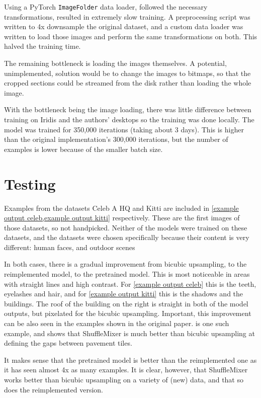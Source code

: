 \documentclass{article}
\begin{document}
    Using a PyTorch {\tt ImageFolder} data loader, followed the necessary transformations, resulted in extremely slow training. A preprocessing script was written to 4x downsample the original dataset, and a custom data loader was written to load those images and perform the same transformations on both. This halved the training time.

    The remaining bottleneck is loading the images themselves. A potential, unimplemented, solution would be to change the images to bitmaps, so that the cropped sections could be streamed from the disk rather than loading the whole image. 

    With the bottleneck being the image loading, there was little difference between training on Iridis and the authors' desktops so the training was done locally. The model was trained for 350,000 iterations (taking about 3 days). This is higher than the original implementation's 300,000 iterations, but the number of examples is lower because of the smaller batch size. 

    \section{Testing}

    Examples from the datasets Celeb A HQ \citep{liu2015faceattributes} and Kitti \citep{Geiger2012CVPR} are included in \cref{example output celeb,example output kitti} respectively. These are the first images of those datasets, so not handpicked. Neither of the models were trained on these datasets, and the datasets were chosen specifically because their content is very different: human faces, and outdoor scenes

    In both cases, there is a gradual improvement from bicubic upsampling, to the  reimplemented model, to the pretrained model. This is most noticeable in areas with straight lines and high contrast. For \cref{example output celeb} this is the teeth, eyelashes and hair, and for \cref{example output kitti} this is the shadows and the buildings. The roof of the building on the right is straight in both of the model outputs, but pixelated for the bicubic upsampling. Important, this improvement can be also seen in the examples shown in the original paper.  is one such example, and shows that ShuffleMixer is much better than bicubic upsampling at defining the gaps between pavement tiles.
    
    It makes sense that the pretrained model is better than the reimplemented one as it has seen almost 4x as many examples. It is clear, however, that ShuffleMixer works better than bicubic upsampling on a variety of (new) data, and that so does the reimplemented version.
\end{document}
